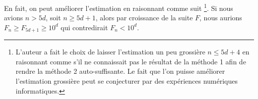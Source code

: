 \medskip


En fait, on peut améliorer l'estimation en raisonnant comme suit
\footnote{
	L'auteur a fait le choix de laisser l'estimation un peu grossière $n \leq 5d + 4$ en raisonnant comme s'il ne connaissait pas le résultat de la méthode 1 afin de rendre la méthode 2 auto-suffisante.
	Le fait que l'on puisse améliorer l'estimation grossière peut se conjecturer par des expériences numériques informatiques.
}.
Si nous avions $n > 5d$, soit $n \geq 5d+1$, alors par croissance de la suite $F$, nous aurions $F_n \geq F_{5d+1} \geq 10^d$ qui contredirait $F_n < 10^d$.
